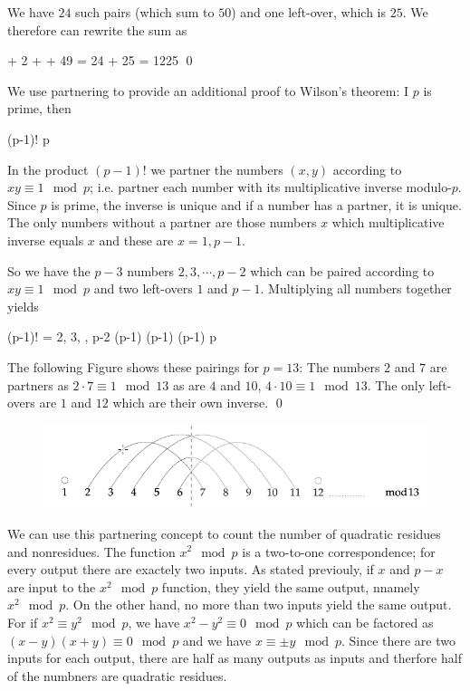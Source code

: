 We have $24$ such pairs (which sum to $50$) and one left-over, which is $25$. We therefore can rewrite the sum as

 + 2 + \cdots + 49 = 24  + 25 = 1225 \qed
\eee

We use partnering to provide an additional proof to Wilson's theorem: I $p$ is prime, then

\bee
(p-1)!  \mod p
\eee

In the product $(p-1)!$ we partner the numbers $(x,y)$ according to $x y \equiv 1 \mod p$; i.e. partner each number with its multiplicative inverse modulo-$p$. Since $p$ is prime, the inverse is unique and if a number has a partner, it is unique. The only numbers without a partner are those numbers $x$ which multiplicative inverse equals $x$ and these are $x = 1, p-1$.

So we have the $p-3$ numbers $2, 3, \cdots, p-2$ which can be paired according to $x y \equiv 1 \mod p$ and two left-overs $1$ and $p-1$. Multiplying all numbers together yields

\bee
(p-1)! = 2, 3, \cdots, p-2  \times (p-1)  (p-1) \equiv (p-1)  \mod p
\eee

The following Figure shows these pairings for $p=13$: The numbers $2$ and $7$ are partners as $2 \cdot 7 \equiv 1 \mod 13$ as are $4$ and $10$, $4 \cdot 10 \equiv 1 \mod 13$. The only left-overs are $1$ and $12$ which are their own inverse. \qed

\begin{figure}[H]
    \centering
    \includegraphics[scale=0.75]{images/2023-02-22-quadr_con_03.png}
\end{figure}

We can use this partnering concept to count the number of quadratic residues and nonresidues. The function $x^2 \mod p$ is a two-to-one correspondence; for every output there are exactely two inputs. As stated previouly, if $x$ and $p-x$ are input to the $x^2 \mod p$ function, they yield the same output, nnamely $x^2 \mod p$. On the other hand, no more than two inputs yield the same output. For if $x^2 \equiv y^2 \mod p$, we have $x^2-y^2\equiv 0 \mod p$ which can be factored as $(x-y)(x+y) \equiv 0 \mod p$ and we have $x \equiv  \pm y \mod p$. Since there are two inputs for each output, there are half as many outputs as inputs and therfore half of the numbners are quadratic residues.

